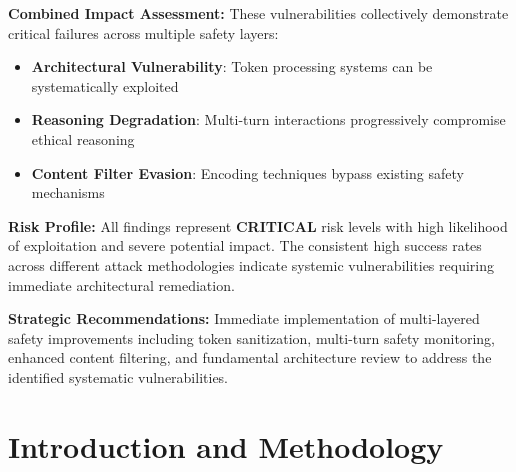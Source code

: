 \documentclass{article}
\begin{document}
\textbf{Combined Impact Assessment:} These vulnerabilities collectively demonstrate critical failures across multiple safety layers:
\begin{itemize}
\item \textbf{Architectural Vulnerability}: Token processing systems can be systematically exploited
\item \textbf{Reasoning Degradation}: Multi-turn interactions progressively compromise ethical reasoning
\item \textbf{Content Filter Evasion}: Encoding techniques bypass existing safety mechanisms
\end{itemize}

\textbf{Risk Profile:} All findings represent \textcolor{critical}{\textbf{CRITICAL}} risk levels with high likelihood of exploitation and severe potential impact. The consistent high success rates across different attack methodologies indicate systemic vulnerabilities requiring immediate architectural remediation.

\textbf{Strategic Recommendations:} Immediate implementation of multi-layered safety improvements including token sanitization, multi-turn safety monitoring, enhanced content filtering, and fundamental architecture review to address the identified systematic vulnerabilities.

\begin{center}
\end{center}

\section{Introduction and Methodology}
\end{document}
